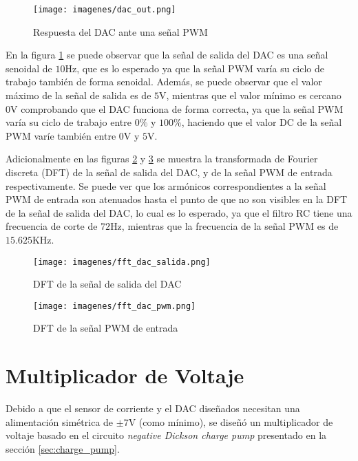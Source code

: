     \begin{figure}[H]
        \centering
        \texttt{[image: imagenes/dac\_out.png]}
        \caption{Respuesta del DAC ante una señal PWM}
        \label{fig:sim_dac}
    \end{figure}

    En la figura \ref{fig:sim_dac} se puede observar que la señal de salida
    del DAC es una señal senoidal de $10\text{Hz}$, que es lo esperado ya 
    que la señal PWM varía su ciclo de trabajo también de forma senoidal.
    Además, se puede observar que el valor máximo de la señal de salida es
    de $5\text{V}$, mientras que el valor mínimo es cercano $0\text{V}$
    comprobando que el DAC funciona de forma correcta, ya que la señal PWM
    varía su ciclo de trabajo entre $0\%$ y $100\%$, haciendo que el valor 
    DC de la señal PWM varíe también entre $0\text{V}$ y $5\text{V}$.

    Adicionalmente en las figuras \ref{fig:sim_dac_fft} y \ref{fig:sim_dac_fft_in}
    se muestra la transformada de Fourier discreta (DFT) de la señal de salida
    del DAC, y de la señal PWM de entrada respectivamente. Se puede ver 
    que los armónicos correspondientes a la señal PWM de entrada son atenuados
    hasta el punto de que no son visibles en la DFT de la señal de salida del
    DAC, lo cual es lo esperado, ya que el filtro RC tiene una frecuencia de corte
    de $72\text{Hz}$, mientras que la frecuencia de la señal PWM es de 
    $15.625\text{KHz}$.

    \begin{figure}[H]
        \centering
        \texttt{[image: imagenes/fft\_dac\_salida.png]}
        \caption{DFT de la señal de salida del DAC}
        \label{fig:sim_dac_fft}
    \end{figure}

    \begin{figure}[H]
        \centering
        \texttt{[image: imagenes/fft\_dac\_pwm.png]}
        \caption{DFT de la señal PWM de entrada}
        \label{fig:sim_dac_fft_in}
    \end{figure}

    \section{Multiplicador de Voltaje}

    Debido a que el sensor de corriente y el DAC diseñados necesitan una
    alimentación simétrica de $\pm 7\text{V}$ (como mínimo), se diseñó 
    un multiplicador de voltaje basado en el circuito \textit{negative 
    Dickson charge pump} presentado en la sección \ref{sec:charge_pump}.


